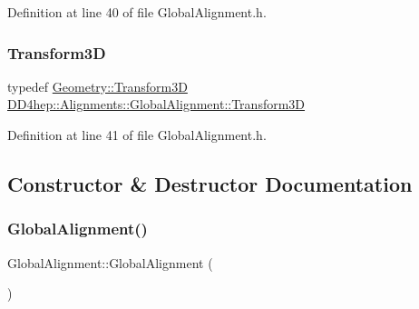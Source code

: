 Definition at line 40 of file Global\+Alignment.\+h.

\hypertarget{class_d_d4hep_1_1_alignments_1_1_global_alignment_a328240cbc53ba92424336a5898ba49d3}{}\label{class_d_d4hep_1_1_alignments_1_1_global_alignment_a328240cbc53ba92424336a5898ba49d3} 
\subsubsection{\texorpdfstring{Transform3D}{Transform3D}}
{\footnotesize\ttfamily typedef \hyperlink{namespace_d_d4hep_1_1_geometry_aeb4c0356d12fd7be49a0aae50514e64b}{Geometry\+::\+Transform3D} \hyperlink{class_d_d4hep_1_1_alignments_1_1_global_alignment_a328240cbc53ba92424336a5898ba49d3}{D\+D4hep\+::\+Alignments\+::\+Global\+Alignment\+::\+Transform3D}\hspace{0.3cm}{\ttfamily [private]}}



Definition at line 41 of file Global\+Alignment.\+h.



\subsection{Constructor \& Destructor Documentation}
\hypertarget{class_d_d4hep_1_1_alignments_1_1_global_alignment_a022dd4bb7b30b90de999a8d9ed3e7d4a}{}\label{class_d_d4hep_1_1_alignments_1_1_global_alignment_a022dd4bb7b30b90de999a8d9ed3e7d4a} 
\subsubsection{\texorpdfstring{Global\+Alignment()}{GlobalAlignment()}\hspace{0.1cm}{\footnotesize\ttfamily [1/5]}}
{\footnotesize\ttfamily Global\+Alignment\+::\+Global\+Alignment (\begin{DoxyParamCaption}{ }\end{DoxyParamCaption})}



